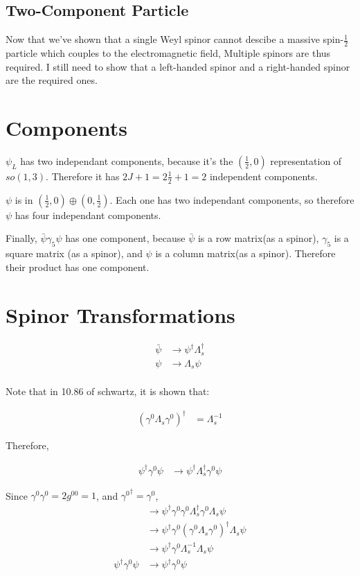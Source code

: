 \documentclass{article}
\begin{document}
\subsection{Two-Component Particle}

Now that we've shown that a single Weyl spinor cannot descibe a massive
	spin-$\frac12$ particle which couples to the electromagnetic field,
Multiple spinors are thus required.
I still need to show that a left-handed spinor and a right-handed spinor
	are the required ones.

\section{Components}

$\psi_L$ has two independant components, because it's the $(\frac12,0)$
	representation of $so(1,3)$.
Therefore it has $2J + 1 = 2 \frac12 + 1 = 2$ independent components.

$\psi$ is in $(\frac12,0) \oplus (0,\frac12)$.
Each one has two independant components, so therefore $\psi$ has four 
	independant components.

Finally, $\bar{\psi} \gamma_5 \psi$ has one component, because $\bar\psi$
	is a row matrix(as a spinor), $\gamma_5$ is a square matrix (as a spinor),
	and $\psi$ is a column matrix(as a spinor).
Therefore their product has one component.

\section{Spinor Transformations}

\begin{align*}
\bar\psi & \to \psi^\dagger \Lambda_s^\dagger\\
\psi & \to \Lambda_s \psi \\
\end{align*}

Note that in 10.86 of schwartz, it is shown that:

\begin{align}
(\gamma^0 \Lambda_s \gamma^0)^\dagger
	& = \Lambda_s^{-1}
\end{align}

Therefore, 

\begin{align*}
\psi^\dagger \gamma^0 \psi 
	& \to \psi^\dagger \Lambda_s^\dagger \gamma^0 \psi
\end{align*}

Since $\gamma^0 \gamma^0 = 2 g^{00} = 1$, and ${\gamma^0}^\dagger = \gamma^0$, 
\begin{align*}
& \to \psi^\dagger \gamma^0 \gamma^0 \Lambda_s^\dagger \gamma^0 \Lambda_s \psi \\
& \to \psi^\dagger \gamma^0 ( \gamma^0 \Lambda_s \gamma^0)^\dagger \Lambda_s \psi \\
& \to \psi^\dagger \gamma^0 \Lambda_s^{-1} \Lambda_s \psi\\
\psi^\dagger \gamma^0 \psi & \to \psi^\dagger \gamma^0 \psi
\end{align*}
\end{document}

